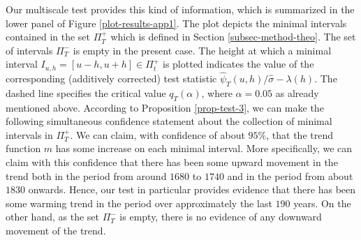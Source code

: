Our multiscale test provides this kind of information, which is summarized in the lower panel of Figure \ref{plot-results-app1}. The plot depicts the minimal intervals contained in the set $\Pi_T^+$ which is defined in Section \ref{subsec-method-theo}. The set of intervals $\Pi_T^-$ is empty in the present case. The height at which a minimal interval $I_{u,h} = [u-h,u+h] \in \Pi_t^+$ is plotted indicates the value of the corresponding (additively corrected) test statistic $\widehat{\psi}_T(u,h) / \widehat{\sigma} - \lambda(h)$. The dashed line specifies the critical value $q_T(\alpha)$, where $\alpha = 0.05$ as already mentioned above. According to Proposition \ref{prop-test-3}, we can make the following simultaneous confidence statement about the collection of minimal intervals in $\Pi_T^+$. We can claim, with confidence of about $95\%$, that the trend function $m$ has some increase on each minimal interval. More specifically, we can claim with this confidence that there has been some upward movement in the trend both in the period from around $1680$ to $1740$ and in the period from about $1830$ onwards. Hence, our test in particular provides evidence that there has been some warming trend in the period over approximately the last $190$ years. On the other hand, as the set $\Pi_T^-$ is empty, there is no evidence of any downward movement of the trend.